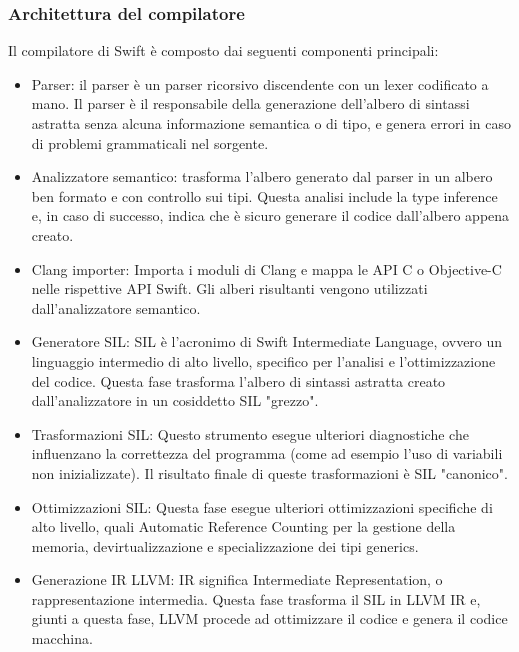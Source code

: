 \subsubsection{Architettura del compilatore}
Il compilatore di Swift è composto dai seguenti componenti principali:
\begin{itemize}
\item Parser: il parser è un parser ricorsivo discendente con un lexer codificato a mano. Il parser è il responsabile della generazione dell'albero di sintassi astratta senza alcuna informazione semantica o di tipo, e genera errori in caso di problemi grammaticali nel sorgente.
\item Analizzatore semantico: trasforma l'albero generato dal parser in un albero ben formato e con controllo sui tipi. Questa analisi include la type inference e, in caso di successo, indica che è sicuro generare il codice dall'albero appena creato.
\item Clang importer: Importa i moduli di Clang e mappa le API C o Objective-C nelle rispettive API Swift. Gli alberi risultanti vengono utilizzati dall'analizzatore semantico.
\item Generatore SIL: SIL è l'acronimo di Swift Intermediate Language, ovvero un linguaggio intermedio di alto livello, specifico per l'analisi e l'ottimizzazione del codice. Questa fase trasforma l'albero di sintassi astratta creato dall'analizzatore in un cosiddetto SIL "grezzo".
\item Trasformazioni SIL: Questo strumento esegue ulteriori diagnostiche che influenzano la correttezza del programma (come ad esempio l'uso di variabili non inizializzate). Il risultato finale di queste trasformazioni è SIL "canonico".
\item Ottimizzazioni SIL: Questa fase esegue ulteriori ottimizzazioni specifiche di alto livello, quali Automatic Reference Counting per la gestione della memoria, devirtualizzazione e specializzazione dei tipi generics.
\item Generazione IR LLVM: IR significa Intermediate Representation, o rappresentazione intermedia. Questa fase trasforma il SIL in LLVM IR e, giunti a questa fase, LLVM procede ad ottimizzare il codice e genera il codice macchina.
\end{itemize}
